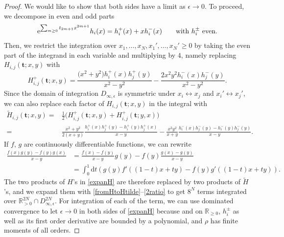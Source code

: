 \documentclass[pdftex]{sigma}
\numberwithin{equation}{section}
\newcommand{\dd}{\mathrm{d}}
\begin{document}
\begin{proof}
We would like to show that both sides have a limit as $\epsilon \rightarrow 0$. To proceed, we decompose in even and odd parts
\[
{\rm e}^{\sum_{m \geq 0} t_{2m + 1}x^{2m + 1}} h_i(x) = h_i^+(x) + xh_i^-(x) \qquad \text{with}\ h_i^{\pm} \ \text{even}.
\]
Then, we restrict the integration over $x_1,\dots,x_N ,x_1',\dots,x_N'\geq 0$ by taking the even part of the integrand in each variable and multiplying by $4$, namely replacing $H_{i,j}(\mathbf{t};x,y)$ with
\[
H_{i,j}^+(\mathbf{t};x,y) = \frac{\bigl(x^2+y^2\bigr)h_i^+(x)h_j^+(y)}{x^2 - y^2} - \frac{2x^2y^2h_i^-(x)h_j^-(y)}{x^2 - y^2}.
\]
Since the domain of integration $D_{\infty,\epsilon}$ is symmetric under $x_i \leftrightarrow x_j$ and $x_i' \leftrightarrow x_j'$, we can also replace each factor of $H_{i,j}(\mathbf{t};x,y)$ in the integral with
\begin{align}
\tilde{H}_{i,j}(\mathbf{t};x,y) ={}& \frac{1}{2}\bigl(H_{i,j}^+(\mathbf{t};x,y) + H_{i,j}^+(\mathbf{t};y,x)\bigr) \label{fromHtoHtilde}\\
={}& \frac{x^2 + y^2}{2(x+y)} \frac{h_i^+(x)h_j^+(y) - h_i^+(y)h_j^+(x)}{x - y} - \frac{x^2y^2}{x+y} \frac{h_i^-(x)h_j^-(y) - h_i^-(y)h_j^-(y)}{x - y}.
\nonumber
\end{align}
If $f$, $g$ are continuously differentiable functions, we can rewrite
\begin{align}
\frac{f(x)g(y) - f(y)g(x)}{x - y} & = \frac{f(x) - f(y)}{x - y} g(y) - f(y) \frac{g(x) - g(y)}{x - y} \nonumber\\
& = \int_{0}^{1}\dd t (g(y)f'((1-t)x + ty) - f(y)g'((1-t)x + ty)).\label{2ratio}
\end{align}
The two products of $H$'s in \eqref{expanH} are therefore replaced by
two products of $\tilde{H}$'s, and we expand them with
\eqref{fromHtoHtilde}--\eqref{2ratio} to get $8^N$ terms integrated
over $\mathbb{R}_{> 0}^{2N} \cap D_{\infty,\epsilon}^{2N}$. For
integration of each of the term, we can use dominated convergence to
let $\epsilon \rightarrow 0$ in both sides of \eqref{expanH} because
 and  on
$\mathbb{R}_{\geq 0}$, $h_i^{\pm}$ as well as its first order derivative are
bounded by a polynomial, and $\rho$ has finite moments of all orders.


\end{proof}
\end{document}
